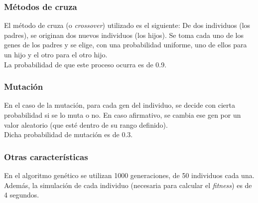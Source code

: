 \documentclass{article}
\begin{document}
\subsubsection{M\'etodos de cruza}
\label{metodos de cruza}
El m\'etodo de cruza (o \textit{crossover}) utilizado es el siguiente: De dos individuos (los padres), se originan dos nuevos individuos (los hijos). Se toma cada uno de los genes de los padres y se elige, con una probabilidad uniforme, uno de ellos para un hijo y el otro para el otro hijo.\\
La probabilidad de que este proceso ocurra es de 0.9.


\subsubsection{Mutaci\'on}
\label{mutacion}
En el caso de la mutaci\'on, para cada gen del individuo, se decide con cierta probabilidad si se lo muta o no. En caso afirmativo, se cambia ese gen por un valor aleatorio (que est\'e dentro de su rango definido).\\
Dicha probabilidad de mutaci\'on es de 0.3.

\subsubsection{Otras caracter\'isticas}
En el algoritmo gen\'etico se utilizan 1000 generaciones, de 50 individuos cada una. Adem\'as, la simulaci\'on de cada individuo (necesaria para calcular el \textit{fitness}) es de 4 segundos.

\end{document}
